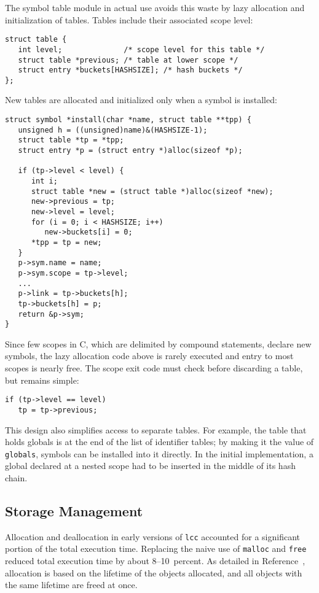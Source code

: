 The symbol table module in actual use avoids
this waste by lazy allocation and initialization
of tables. Tables include their associated scope level:
\begin{verbatim}
struct table {
   int level;              /* scope level for this table */
   struct table *previous; /* table at lower scope */
   struct entry *buckets[HASHSIZE]; /* hash buckets */
};
\end{verbatim}
New tables are allocated and initialized only
when a symbol is installed:
\begin{verbatim}
struct symbol *install(char *name, struct table **tpp) {
   unsigned h = ((unsigned)name)&(HASHSIZE-1);
   struct table *tp = *tpp;
   struct entry *p = (struct entry *)alloc(sizeof *p);

   if (tp->level < level) {
      int i;
      struct table *new = (struct table *)alloc(sizeof *new);
      new->previous = tp;
      new->level = level;
      for (i = 0; i < HASHSIZE; i++)
         new->buckets[i] = 0;
      *tpp = tp = new;
   }
   p->sym.name = name;
   p->sym.scope = tp->level;
   ...
   p->link = tp->buckets[h];
   tp->buckets[h] = p;
   return &p->sym;
}
\end{verbatim}
Since few scopes in C, which are delimited by compound statements,
declare new symbols, the lazy allocation code above is rarely
executed and entry to most scopes is nearly free.
The scope exit code must check before
discarding a table, but remains simple: 
\begin{verbatim}
if (tp->level == level)
   tp = tp->previous;
\end{verbatim}

This design also simplifies access to separate tables.
For example, the table that holds globals is at the end
of the list of identifier tables; by making it
the value of \verb|globals|, symbols can be
installed into it directly.
In the initial implementation, a global declared at a nested
scope had to be inserted in the middle of its hash chain.

\subsection{Storage Management}

Allocation and deallocation in early versions of \verb|lcc|
accounted for a significant portion of the total execution time.
Replacing the naive use of \verb|malloc| and \verb|free|
reduced total execution time by about 8--10~percent.
As detailed in Reference~\cite{hanson90},
allocation is based on the lifetime of the objects allocated,
and all objects with the same lifetime are freed at once.

